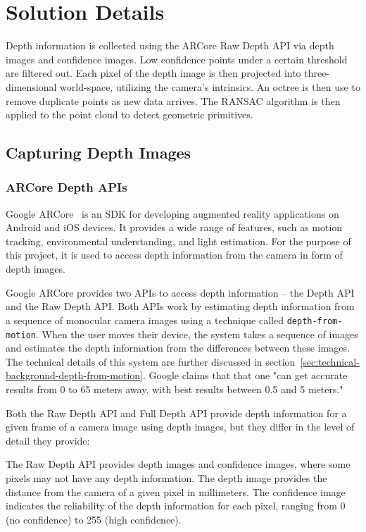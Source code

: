 \chapter{Solution Details}

Depth information is collected using the ARCore Raw Depth API via depth images and confidence images.
Low confidence points under a certain threshold are filtered out.
Each pixel of the depth image is then projected into three-dimensional world-space, utilizing the camera's intrinsics.
An octree is then use to remove duplicate points as new data arrives.
The RANSAC algorithm is then applied to the point cloud to detect geometric primitives.


\section{Capturing Depth Images}

\subsection{ARCore Depth APIs}

Google ARCore~\parencite{google_llc_arcore_doc} is an SDK for developing augmented reality applications on Android and iOS devices.
It provides a wide range of features, such as motion tracking, environmental understanding, and light estimation.
For the purpose of this project, it is used to access depth information from the camera in form of depth images.

Google ARCore provides two APIs to access depth information -- the Depth API and the Raw Depth API\@.
Both APIs work by estimating depth information from a sequence of monocular camera images using
a technique called \texttt{depth-from-motion}.
When the user moves their device, the system takes a sequence of images and estimates the depth information from the differences between these images.
The technical details of this system are further discussed in section~\ref{sec:technical-background-depth-from-motion}.
Google claims that that one "can get accurate results from 0 to 65 meters away,
with best results between 0.5 and 5 meters."~\parencite{google_llc_arcore_doc}

Both the Raw Depth API and Full Depth API provide depth information for a given frame of a camera image using depth images, but they differ in the level of detail they provide:

The Raw Depth API provides depth images and confidence images, where some pixels may not have any depth information.
The depth image provides the distance from the camera of a given pixel in millimeters.
The confidence image indicates the reliability of the depth information for each pixel, ranging from 0 (no confidence) to 255 (high confidence).

